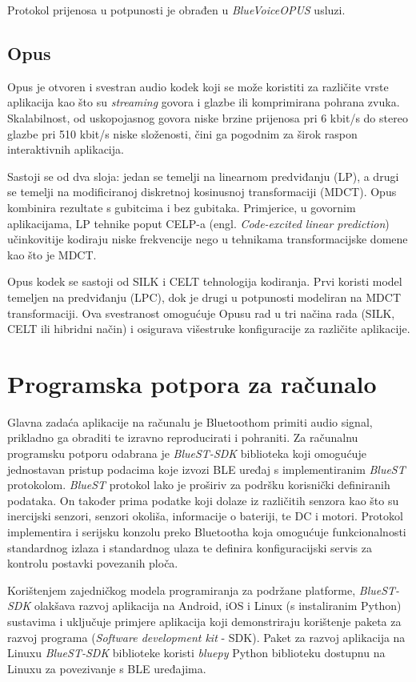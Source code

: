 Protokol prijenosa u potpunosti je obrađen u \textit{BlueVoiceOPUS} usluzi.
\subsection{Opus}
Opus je otvoren i svestran audio kodek koji se može koristiti za različite vrste aplikacija kao što su \textit{streaming} govora i glazbe ili komprimirana pohrana zvuka. Skalabilnost, od uskopojasnog govora niske brzine prijenosa pri 6 kbit/s do stereo glazbe pri 510 kbit/s niske složenosti, čini ga pogodnim za širok raspon interaktivnih aplikacija.

Sastoji se od dva sloja: jedan se temelji na linearnom predviđanju (LP), a drugi se temelji na modificiranoj diskretnoj kosinusnoj transformaciji (MDCT). Opus kombinira rezultate s gubitcima i bez gubitaka. Primjerice, u govornim aplikacijama, LP tehnike poput CELP-a (engl. \textit{Code-excited linear prediction}) učinkovitije kodiraju niske frekvencije nego u tehnikama transformacijske domene kao što je MDCT.

Opus kodek se sastoji od SILK i CELT tehnologija kodiranja. Prvi koristi model temeljen na predviđanju (LPC), dok je drugi u potpunosti modeliran na MDCT transformaciji. Ova svestranost omogućuje Opusu rad u tri načina rada (SILK, CELT ili hibridni način) i osigurava višestruke konfiguracije za različite aplikacije.

\section{Programska potpora za računalo}

Glavna zadaća aplikacije na računalu je Bluetoothom primiti audio signal, prikladno ga obraditi te izravno reproducirati i pohraniti. Za računalnu programsku potporu odabrana je \textit{BlueST-SDK} biblioteka koji omogućuje jednostavan pristup podacima koje izvozi BLE uređaj s implementiranim \textit{BlueST} protokolom. \textit{BlueST} protokol lako je proširiv za podršku korisnički definiranih podataka. On također prima podatke koji dolaze iz različitih senzora kao što su inercijski senzori, senzori okoliša, informacije o bateriji, te DC i motori. Protokol implementira i serijsku konzolu preko Bluetootha koja omogućuje funkcionalnosti standardnog izlaza i standardnog ulaza te definira konfiguracijski servis za kontrolu postavki povezanih ploča. 

Korištenjem zajedničkog modela programiranja za podržane platforme, \textit{BlueST-SDK} olakšava razvoj aplikacija na Android, iOS i Linux (s instaliranim Python) sustavima i uključuje primjere aplikacija koji demonstriraju korištenje paketa za razvoj programa (\textit{Software development kit} - SDK). Paket za razvoj aplikacija na Linuxu \textit{BlueST-SDK} biblioteke koristi \textit{bluepy} Python biblioteku dostupnu na Linuxu za povezivanje s BLE uređajima.


